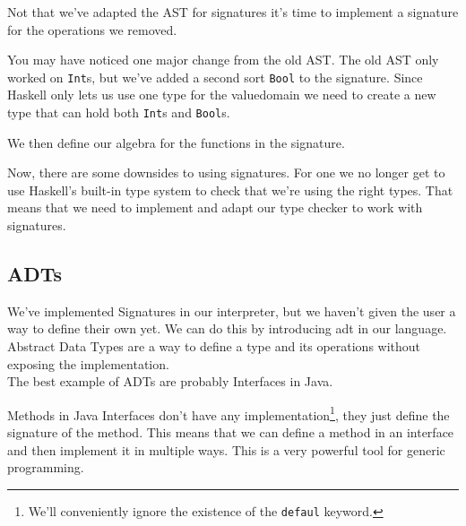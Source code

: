 Not that we've adapted the AST for signatures it's time to implement a signature for the operations we removed.

\begin{figure}[H]
    
    \label{fig:sig}
\end{figure}
You may have noticed one major change from the old AST. The old AST only worked on \texttt{Int}s, but we've added a second sort \texttt{Bool} to the signature.
Since Haskell only lets us use one type for the valuedomain we need to create a new type that can hold both \texttt{Int}s and \texttt{Bool}s.

\begin{figure}[H]
    
    \label{fig:valuedomain}
\end{figure}
\newpage

We then define our algebra for the functions in the signature.

\begin{figure}[H]
    
    \label{fig:alg}
\end{figure}

Now, there are some downsides to using signatures. For one we no longer get to use Haskell's built-in type system to check that we're using the right types.
That means that we need to implement and adapt our type checker to work with signatures.

\subsection{ADTs}
We've implemented Signatures in our interpreter, but we haven't given the user a way to define their own yet. 
We can do this by introducing \gls{adt} in our language.
Abstract Data Types are a way to define a type and its operations without exposing the implementation. \\
The best example of ADTs are probably Interfaces in Java.

Methods in Java Interfaces don't have any implementation\footnote{We'll conveniently ignore the existence of the \texttt{defaul} keyword.}, they just define the signature of the method.
This means that we can define a method in an interface and then implement it in multiple ways.
This is a very powerful tool for generic programming.

